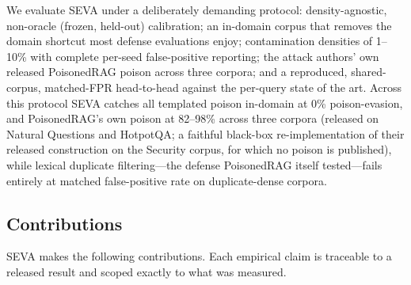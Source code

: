 \documentclass[10pt,journal,compsoc]{IEEEtran}
\begin{document}
We evaluate SEVA under a deliberately demanding protocol: density-agnostic,
non-oracle (frozen, held-out) calibration; an in-domain corpus that removes the
domain shortcut most defense evaluations enjoy; contamination densities of
1--10\% with complete per-seed false-positive reporting; the attack authors' own
released PoisonedRAG poison across three corpora; and a reproduced,
shared-corpus, matched-FPR head-to-head against the per-query state of the
art.
Across this protocol SEVA catches all templated poison in-domain at 0\% poison-evasion,
and PoisonedRAG's own poison at 82--98\% across three corpora (released on Natural
Questions and HotpotQA; a faithful black-box re-implementation of their released
construction on the Security corpus, for which no poison is published), while lexical
duplicate filtering---the defense PoisonedRAG itself tested---fails entirely at
matched false-positive rate on duplicate-dense corpora.

\subsection{Contributions}
SEVA makes the following contributions. Each empirical claim is traceable to a
released result and scoped exactly to what was measured.
\end{document}
